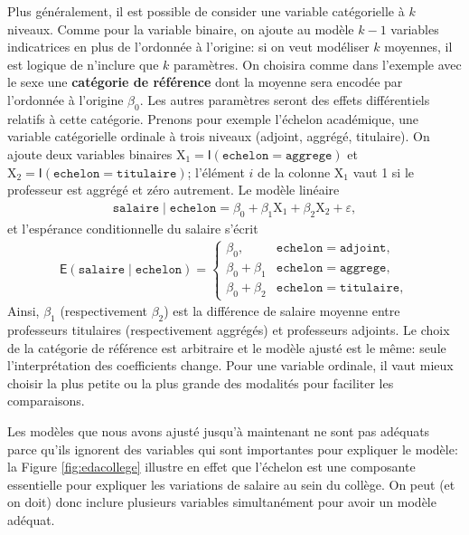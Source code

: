 \documentclass[
  11pt,
  letterpaper,
]{article}
\theoremstyle{definition}
\theoremstyle{definition}
\theoremstyle{definition}
\theoremstyle{remark}
\begin{document}
Plus généralement, il est possible de consider une variable catégorielle à \(k\) niveaux. Comme pour la variable binaire, on ajoute au modèle \(k-1\) variables indicatrices en plus de l'ordonnée à l'origine: si on veut modéliser \(k\) moyennes, il est logique de n'inclure que \(k\) paramètres. On choisira comme dans l'exemple avec le sexe une \textbf{catégorie de référence} dont la moyenne sera encodée par l'ordonnée à l'origine \(\beta_0\). Les autres paramètres seront des effets différentiels relatifs à cette catégorie. Prenons pour exemple l'échelon académique, une variable catégorielle ordinale à trois niveaux (adjoint, aggrégé, titulaire). On ajoute deux variables binaires \(\mathrm{X}_1 = \mathsf{I}(\texttt{echelon}=\texttt{aggrege})\) et \(\mathrm{X}_2 = \mathsf{I}(\texttt{echelon}=\texttt{titulaire})\); l'élément \(i\) de la colonne \(\mathrm{X}_1\) vaut 1 si le professeur est aggrégé et zéro autrement. Le modèle linéaire
\begin{align*}
\texttt{salaire} \mid \texttt{echelon}=\beta_0 + \beta_1 \mathrm{X}_1+\beta_2\mathrm{X}_2 + \varepsilon,
\end{align*}
et l'espérance conditionnelle du salaire s'écrit
\begin{align*}
\mathsf{E}(\texttt{salaire} \mid \texttt{echelon})= \begin{cases}
\beta_0, & \texttt{echelon}=\texttt{adjoint},\\
\beta_0 + \beta_1 & \texttt{echelon}=\texttt{aggrege},\\
\beta_0 + \beta_2 & \texttt{echelon}=\texttt{titulaire},
\end{cases}
\end{align*}
Ainsi, \(\beta_1\) (respectivement \(\beta_2\)) est la différence de salaire moyenne entre professeurs titulaires (respectivement aggrégés) et professeurs adjoints.
Le choix de la catégorie de référence est arbitraire et le modèle ajusté est le même: seule l'interprétation des coefficients change. Pour une variable ordinale, il vaut mieux choisir la plus petite ou la plus grande des modalités pour faciliter les comparaisons.

Les modèles que nous avons ajusté jusqu'à maintenant ne sont pas adéquats parce qu'ils ignorent des variables qui sont importantes pour expliquer le modèle: la Figure \ref{fig:edacollege} illustre en effet que l'échelon est une composante essentielle pour expliquer les variations de salaire au sein du collège. On peut (et on doit) donc inclure plusieurs variables simultanément pour avoir un modèle adéquat.
\end{document}
